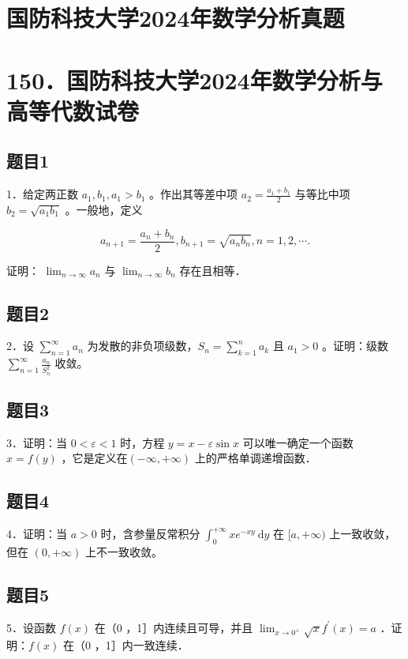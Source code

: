 \documentclass{article}
\begin{document}
\section*{国防科技大学2024年数学分析真题}
\section*{150．国防科技大学2024年数学分析与高等代数试卷}

\subsection{题目1}
1．给定两正数 \(a_{1}, b_{1}, a_{1}>b_{1}\) 。作出其等差中项 \(a_{2}=\frac{a_{1}+b_{1}}{2}\) 与等比中项 \(b_{2}=\sqrt{a_{1} b_{1}}\) 。一般地，定义

\[
a_{n+1}=\frac{a_{n}+b_{n}}{2}, b_{n+1}=\sqrt{a_{n} b_{n}}, n=1,2, \cdots .
\]

证明： \(\lim _{n \rightarrow \infty} a_{n}\) 与 \(\lim _{n \rightarrow \infty} b_{n}\) 存在且相等．

\subsection{题目2}
2．设 \(\sum_{n=1}^{\infty} a_{n}\) 为发散的非负项级数，\(S_{n}=\sum_{k=1}^{n} a_{k}\) 且 \(a_{1}>0\) 。证明：级数 \(\sum_{n=1}^{\infty} \frac{a_{n}}{S_{n}^{2}}\) 收敛。

\subsection{题目3}
3．证明：当 \(0<\varepsilon<1\) 时，方程 \(y=x-\varepsilon \sin x\) 可以唯一确定一个函数 \(x=f(y)\) ，它是定义在\((-\infty,+\infty)\) 上的严格单调递增函数．

\subsection{题目4}
4．证明：当 \(a>0\) 时，含参量反常积分 \(\int_{0}^{+\infty} x e^{-x y} \mathrm{~d} y\) 在 \([a,+\infty)\) 上一致收敛，但在 \((0,+\infty)\) 上不一致收敛。

\subsection{题目5}
5．设函数 \(f(x)\) 在（0 ，1］内连续且可导，并且 \(\lim _{x \rightarrow 0^{+}} \sqrt{x} f^{\prime}(x)=a\) ．证明：\(f(x)\) 在（0 ，1］内一致连续．
\end{document}

